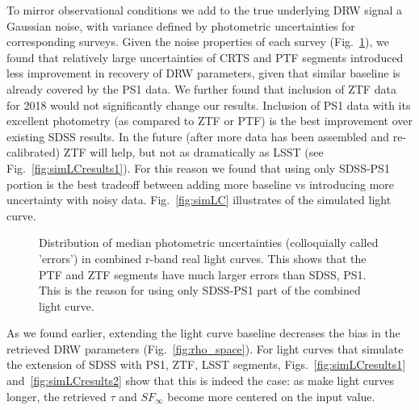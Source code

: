 \documentclass[twocolumn]{aastex62}
\begin{document}
To mirror observational conditions we add to the true underlying DRW signal a Gaussian noise, with variance defined by photometric uncertainties for corresponding surveys. Given the noise properties of each survey (Fig.~\ref{fig:combinedLCerrors}), we found that relatively large uncertainties of CRTS and PTF segments introduced less improvement in recovery of DRW parameters, given that similar baseline is already covered by the PS1 data.  We further found that inclusion of ZTF data for 2018 would not significantly change our results. Inclusion of PS1 data with its excellent photometry (as compared to ZTF or PTF) is the best improvement over existing SDSS results.  In the future (after more data has been assembled and re-calibrated) ZTF will help, but not as dramatically as LSST (see Fig.~\ref{fig:simLCresults1}).  For this reason we found that using only SDSS-PS1 portion is the best tradeoff between adding more baseline vs introducing more uncertainty with noisy data. Fig.~\ref{fig:simLC} illustrates  of  the simulated light curve. 

\begin{figure}%
\caption{Distribution of median photometric uncertainties (colloquially called 'errors') in combined r-band real light curves. This shows that the PTF and ZTF segments have much larger errors than SDSS, PS1. This is the reason for using only SDSS-PS1 part of the combined light curve.}
\label{fig:combinedLCerrors}
\end{figure} 

As we found earlier, extending the light curve baseline decreases the bias in the retrieved DRW parameters (Fig.~\ref{fig:rho_space}). For light curves that simulate the extension of SDSS with PS1, ZTF, LSST segments, Figs.~\ref{fig:simLCresults1} and~\ref{fig:simLCresults2} show that this is indeed the case: as make light curves longer, the retrieved $\tau$ and $SF_{\infty}$ become more centered on the input value. 

\begin{figure*}
\caption{Retrieved $\tau$ and $\sigma$  parameters for simulated LCs. }
\label{fig:simLCresults1}
\end{figure*} 

\begin{figure*}
\caption{Comparison of retrieved parameters in relation to input parameters, shown as Fig.18 in \citet{macleod2011} }
\label{fig:simLCresults2}
\end{figure*} 
\end{document}
